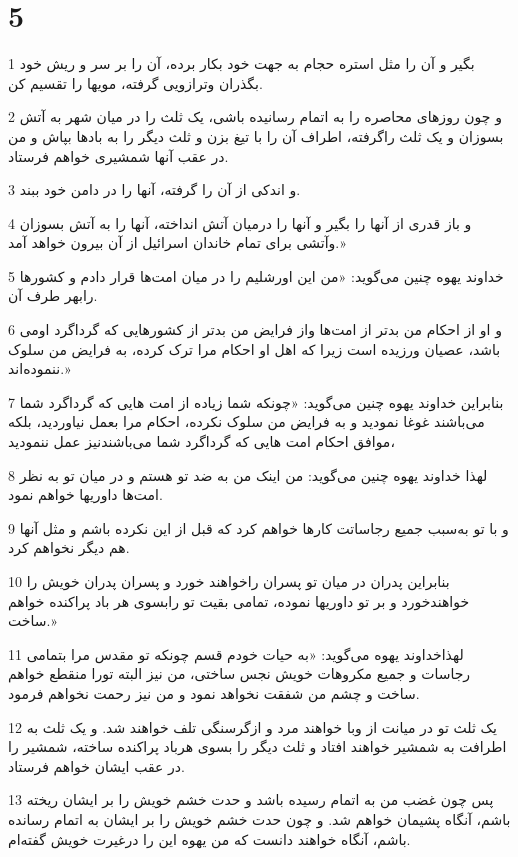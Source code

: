 \chapter{5}

\par 1 بگیر و آن را مثل استره حجام به جهت خود بکار برده، آن را بر سر و ریش خود بگذران وترازویی گرفته، مویها را تقسیم کن.
\par 2 و چون روزهای محاصره را به اتمام رسانیده باشی، یک ثلث را در میان شهر به آتش بسوزان و یک ثلث راگرفته، اطراف آن را با تیغ بزن و ثلث دیگر را به بادها بپاش و من در عقب آنها شمشیری خواهم فرستاد.
\par 3 و اندکی از آن را گرفته، آنها را در دامن خود ببند.
\par 4 و باز قدری از آنها را بگیر و آنها را درمیان آتش انداخته، آنها را به آتش بسوزان وآتشی برای تمام خاندان اسرائیل از آن بیرون خواهد آمد.»
\par 5 خداوند یهوه چنین می‌گوید: «من این اورشلیم را در میان امت‌ها قرار دادم و کشورها رابهر طرف آن.
\par 6 و او از احکام من بدتر از امت‌ها واز فرایض من بدتر از کشورهایی که گرداگرد اومی باشد، عصیان ورزیده است زیرا که اهل او احکام مرا ترک کرده، به فرایض من سلوک ننموده‌اند.»
\par 7 بنابراین خداوند یهوه چنین می‌گوید: «چونکه شما زیاده از امت هایی که گرداگرد شما می‌باشند غوغا نمودید و به فرایض من سلوک نکرده، احکام مرا بعمل نیاوردید، بلکه موافق احکام امت هایی که گرداگرد شما می‌باشندنیز عمل ننمودید،
\par 8 لهذا خداوند یهوه چنین می‌گوید: من اینک من به ضد تو هستم و در میان تو به نظر امت‌ها داوریها خواهم نمود.
\par 9 و با تو به‌سبب جمیع رجاساتت کارها خواهم کرد که قبل از این نکرده باشم و مثل آنها هم دیگر نخواهم کرد.
\par 10 بنابراین پدران در میان تو پسران راخواهند خورد و پسران پدران خویش را خواهندخورد و بر تو داوریها نموده، تمامی بقیت تو رابسوی هر باد پراکنده خواهم ساخت.»
\par 11 لهذاخداوند یهوه می‌گوید: «به حیات خودم قسم چونکه تو مقدس مرا بتمامی رجاسات و جمیع مکروهات خویش نجس ساختی، من نیز البته تورا منقطع خواهم ساخت و چشم من شفقت نخواهد نمود و من نیز رحمت نخواهم فرمود.
\par 12 یک ثلث تو در میانت از وبا خواهند مرد و ازگرسنگی تلف خواهند شد. و یک ثلث به اطرافت به شمشیر خواهند افتاد و ثلث دیگر را بسوی هرباد پراکنده ساخته، شمشیر را در عقب ایشان خواهم فرستاد.
\par 13 پس چون غضب من به اتمام رسیده باشد و حدت خشم خویش را بر ایشان ریخته باشم، آنگاه پشیمان خواهم شد. و چون حدت خشم خویش را بر ایشان به اتمام رسانده باشم، آنگاه خواهند دانست که من یهوه این را درغیرت خویش گفته‌ام.
